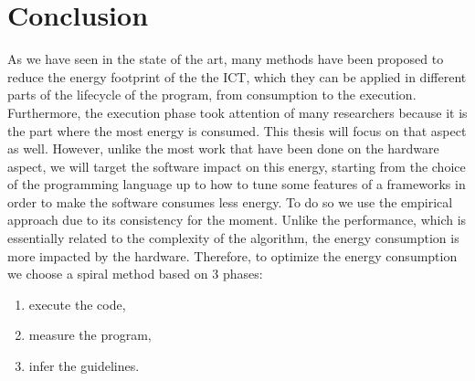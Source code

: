 






\section{Conclusion}
As we have seen in the state of the art, many methods have been proposed to reduce the energy footprint of the the ICT, which they can be applied in different parts of the lifecycle of the program, from consumption to the execution.
Furthermore, the execution phase took attention of many researchers because it is the part where the most energy is consumed.
This thesis will focus on that aspect as well.
However, unlike the most work that have been done on the hardware aspect, we will target the software impact on this energy, starting from the choice of the programming language up to how to tune some features of a frameworks in order to make the software consumes less energy.
To do so we use the empirical approach due to its consistency for the moment.
Unlike the performance, which is essentially related to the complexity of the algorithm, the energy consumption is more impacted by the hardware.
Therefore, to optimize the energy consumption we choose a spiral method based on 3 phases:
\begin{enumerate}
    \item execute the code,
    \item measure the program,
    \item infer the guidelines.
\end{enumerate}


